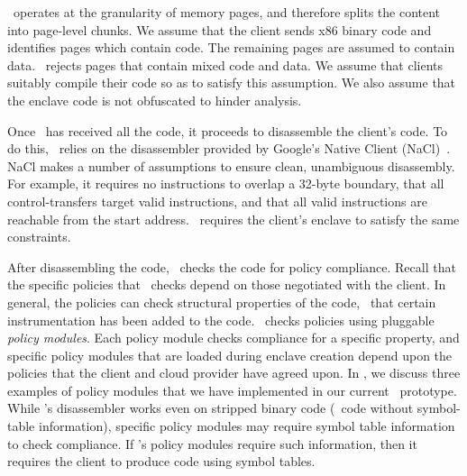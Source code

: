 \tool\ operates at the granularity of memory pages, and therefore
splits the content into page-level chunks.  We assume that the client sends x86
binary code and identifies pages which contain code. The remaining pages are
assumed to contain data. \tool\ rejects pages that contain mixed code and data.
We assume that clients suitably compile their code so as to satisfy this
assumption. We also assume that the enclave code is not obfuscated to hinder
analysis.

Once \tool\ has received all the code, it proceeds to disassemble the client's
code. To do this, \tool\ relies on the disassembler provided by Google's Native
Client (NaCl)~\cite{nativeclient:oak09}. NaCl makes a number of assumptions to
ensure clean, unambiguous disassembly. For example, it requires no instructions
to overlap a 32-byte boundary, that all control-transfers target valid
instructions, and that all valid instructions are reachable from the start
address. \tool\ requires the client's enclave to satisfy the same constraints.

After disassembling the code, \tool\ checks the code for policy compliance.
Recall that the specific policies that \tool\ checks depend on those negotiated
with the client. In general, the policies can check structural properties of
the code, \eg~that certain instrumentation has been added to the code. \tool\
checks policies using pluggable \textit{policy modules}. Each policy module
checks compliance for a specific property, and specific policy modules that are
loaded during enclave creation depend upon the policies that the client and
cloud provider have agreed upon. In \sectref{section:evaluation}, we discuss
three examples of policy modules that we have implemented in our current \tool\
prototype. While \tool's disassembler works even on stripped binary code
(\ie~code without symbol-table information), specific policy modules may
require symbol table information to check compliance. If \tool's policy modules
require such information, then it requires the client to produce code using
symbol tables.

